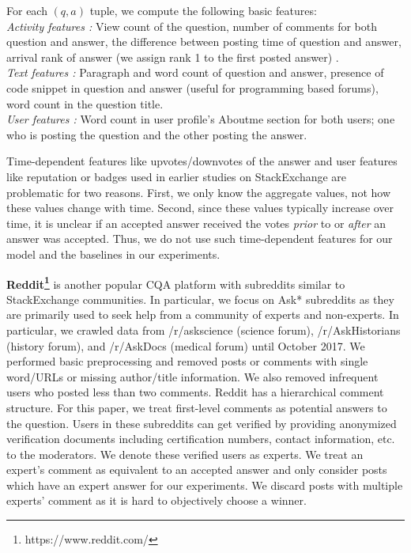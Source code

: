 For each $(q, a)$ tuple, we compute the following basic features:\\
\emph{Activity features :} View count of the question, number of comments for both question and answer, the difference between posting time of question and answer, arrival rank of answer (we assign rank 1 to the first posted answer) \cite{TianZL13}. \\
\emph{Text features :} Paragraph and word count of question and answer, presence of code snippet in question and answer (useful for programming based forums), word count in the question title.\\
\emph{User features :} Word count in user profile's Aboutme section for both users; one who is posting the question and the other posting the answer.

Time-dependent features like upvotes/downvotes of the answer and user features like reputation or badges used in earlier studies on StackExchange \cite{BurelMA16} are problematic for two reasons. First, we only know the aggregate values, not how these values change with time. Second, since these values typically increase over time, it is unclear if an accepted answer received the votes \emph{prior} to or \emph{after} an answer was accepted. Thus, we do not use such time-dependent features for our model and the baselines in our experiments.

\textbf{Reddit\footnote{https://www.reddit.com/}} is another popular CQA platform with subreddits similar to StackExchange communities. In particular, we focus on Ask* subreddits as they are primarily used to seek help from a community of experts and non-experts. In particular, we crawled data from /r/askscience (science forum), /r/AskHistorians (history forum), and /r/AskDocs (medical forum) until October 2017. We performed basic preprocessing and removed posts or comments with single word/URLs or missing author/title information. We also removed infrequent users who posted less than two comments.
Reddit has a hierarchical comment structure. For this paper, we treat first-level comments as potential answers to the question. Users in these subreddits can get verified by providing anonymized verification documents including certification numbers, contact information, etc. to the moderators. We denote these verified users as experts. We treat an expert's comment as equivalent to an accepted answer and only consider posts which have an expert answer for our experiments. We discard posts with multiple experts' comment as it is hard to objectively choose a winner.

